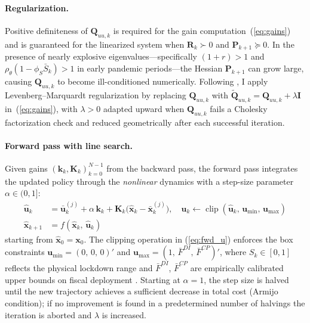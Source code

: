 \paragraph{Regularization.}
Positive definiteness of $\bm{Q}_{uu,k}$ is required for the gain
computation~(\ref{eq:gains}) and is guaranteed for the linearized system when
$\bm{R}_k \succ 0$ and $\bm{P}_{k+1} \succeq 0$. In the presence of nearly
explosive eigenvalues---specifically $(1+r) > 1$ and
$\rho_\theta(1-\phi_S \bar{S}_k) > 1$ in early pandemic periods---the Hessian
$\bm{P}_{k+1}$ can grow large, causing $\bm{Q}_{uu,k}$ to become ill-conditioned
numerically. Following \citet{tassa2014control}, I apply
Levenberg--Marquardt regularization by replacing $\bm{Q}_{uu,k}$ with
$\tilde{\bm{Q}}_{uu,k} = \bm{Q}_{uu,k} + \lambda\bm{I}$ in~(\ref{eq:gains}), with
$\lambda > 0$ adapted upward when $\bm{Q}_{uu,k}$ fails a Cholesky factorization
check and reduced geometrically after each successful iteration.

\paragraph{Forward pass with line search.}
Given gains $(\bm{k}_k, \bm{K}_k)_{k=0}^{N-1}$ from the backward pass, the forward
pass integrates the updated policy through the \emph{nonlinear} dynamics with a
step-size parameter $\alpha \in (0, 1]$:
%
\begin{align}
    \hat{\bm{u}}_k   &= \bar{\bm{u}}_k^{(j)}
        + \alpha\,\bm{k}_k
        + \bm{K}_k\bigl(\hat{\bm{x}}_k - \bar{\bm{x}}_k^{(j)}\bigr),
    \quad \hat{\bm{u}}_k \leftarrow
        \operatorname{clip}\!\left(\hat{\bm{u}}_k,\, \bm{u}_{\min},\, \bm{u}_{\max}\right)
    \label{eq:fwd_u} \\[4pt]
    \hat{\bm{x}}_{k+1} &= f\!\left(\hat{\bm{x}}_k,\, \hat{\bm{u}}_k\right)
    \label{eq:fwd_x}
\end{align}
%
starting from $\hat{\bm{x}}_0 = \bm{x}_0$. The clipping operation in
(\ref{eq:fwd_u}) enforces the box constraints
$\bm{u}_{\min} = (0,\, 0,\, 0)'$ and $\bm{u}_{\max} = (1,\, \bar{F}^{DI},\,
\bar{F}^{CP})'$, where $S_k \in [0,1]$ reflects the physical lockdown range and
$\bar{F}^{DI}$, $\bar{F}^{CP}$ are empirically calibrated upper bounds on fiscal
deployment \citep{tassa2014control}. Starting at $\alpha = 1$, the step size is
halved until the new trajectory achieves a sufficient decrease in total cost
(Armijo condition); if no improvement is found in a predetermined number of halvings
the iteration is aborted and $\lambda$ is increased.

